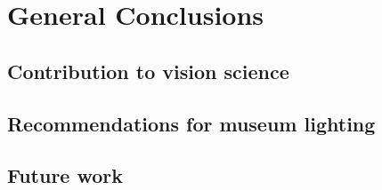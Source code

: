 \chapter{General Conclusions}
\label{chap:Conclusions}

\section{Contribution to vision science}
\section{Recommendations for museum lighting}
\section{Future work}

